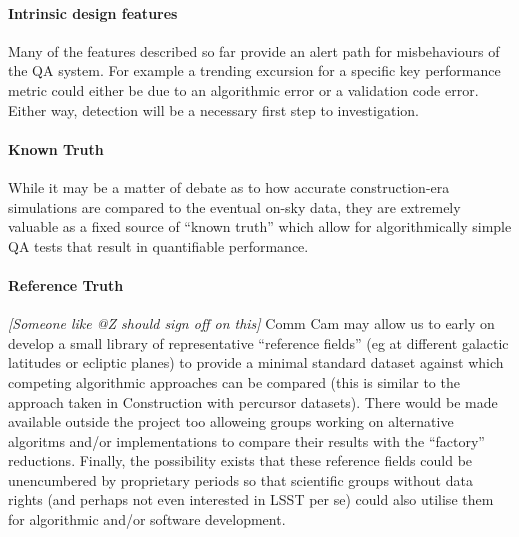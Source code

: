 \paragraph{Intrinsic design features}

Many of the features described so far provide an alert path for misbehaviours of the QA system. For example a trending excursion for a specific key performance metric could either be due to an algorithmic error or a validation code error. Either way, detection will be a necessary first step to investigation.

\paragraph{Known Truth}

While it may be a matter of debate as to how accurate construction-era simulations are compared to the eventual on-sky data, they are extremely valuable as a fixed source of ``known truth'' which allow for algorithmically simple QA tests that result in quantifiable performance.

\paragraph{Reference Truth}

\emph{[Someone like @Z should sign off on this]} Comm Cam may allow us to early on develop a small library of representative ``reference fields'' (eg at different galactic latitudes or ecliptic planes) to provide a minimal standard dataset against which competing algorithmic approaches can be compared (this is similar to the approach taken in Construction with percursor datasets). There would be made available outside the project too alloweing groups working on alternative algoritms and/or implementations to compare their results with the ``factory'' reductions. Finally, the possibility exists that these reference fields could be unencumbered by proprietary periods so that scientific groups without data rights (and perhaps not even interested in LSST per se) could also utilise them for algorithmic and/or software development.

